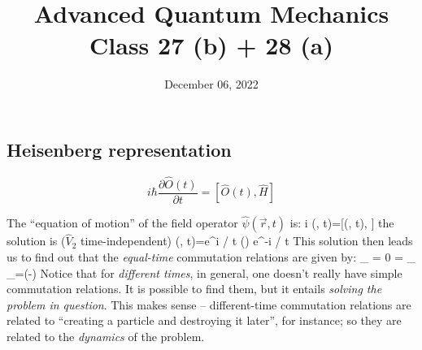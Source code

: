\documentclass[12pt]{article}
\title{Advanced Quantum Mechanics\\Class 27 (b) + 28 (a)}
\date{December 06, 2022}                                           %
\begin{document}
\maketitle

\setcounter{section}{9}
\setcounter{subsection}{5}


\subsection{Heisenberg representation}
\[
\boxed{
i \hbar \frac{\partial \hat{O}(t)}{\partial t}=[\hat{O}(t), \hat{H}]
}
\]

The ``equation of motion'' of the field operator $\hat{\psi}(\vec{r}, t)$ is:
\setcounter{equation}{88}
\be
i \hbar {} \hat{\psi}(, t)=[\hat{\psi}(, t), ]
\ee
the solution is ($\hat{V}_2$ time-independent)
\be
\hat{\psi}(, t)=e^{i / \hbar {} t} \hat{\psi}() e^{-i / \hbar {} t}
\ee
%
This solution then leads us to find out that the \emph{equal-time} commutation relations are given by:
\be
{}_{\mp} = 0 =
_{\mp}
\ee
\be
{}_{\mp}=\delta\left(-\vecrp\right)
\ee
Notice that for \emph{different times}, in general, 
one doesn't really have simple commutation relations.
It is possible to find them, but it entails
\emph{solving the problem in question}.
This makes sense -- different-time commutation relations are related to
``creating a particle and destroying it later'', for instance;
so they are related to the \emph{dynamics} of the problem.
\end{document}
